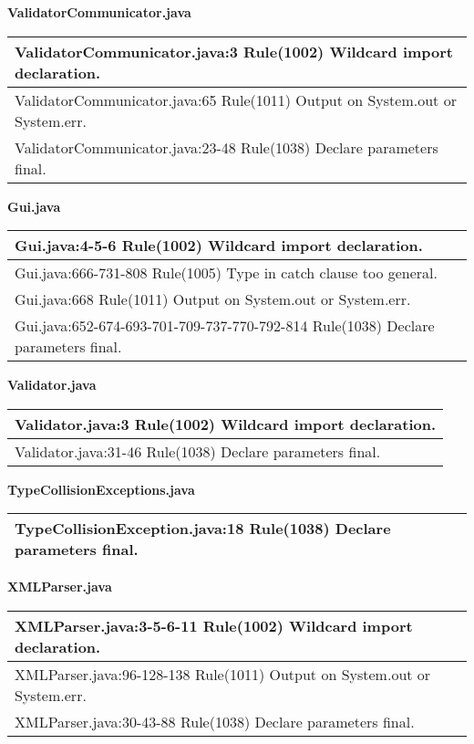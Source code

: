 \textbf{ValidatorCommunicator.java}
\begin{center}
\begin{tabular}{|p{12cm}|} \hline
ValidatorCommunicator.java:3 Rule(1002) Wildcard import declaration. \\ \hline
ValidatorCommunicator.java:65 Rule(1011) Output on System.out or System.err. \\ \hline
ValidatorCommunicator.java:23-48 Rule(1038) Declare parameters final. \\ \hline
\end{tabular}
\end{center}

\textbf{Gui.java}
\begin{center}
\begin{tabular}{|p{12cm}|} \hline
Gui.java:4-5-6 Rule(1002) Wildcard import declaration.\\ \hline
Gui.java:666-731-808 Rule(1005) Type in catch clause too general.\\ \hline
Gui.java:668 Rule(1011) Output on System.out or System.err.\\ \hline
Gui.java:652-674-693-701-709-737-770-792-814 Rule(1038) Declare parameters final.\\ \hline
\end{tabular}
\end{center}

\textbf{Validator.java}
\begin{center}
\begin{tabular}{|p{12cm}|} \hline
Validator.java:3 Rule(1002) Wildcard import declaration.\\ \hline
Validator.java:31-46 Rule(1038) Declare parameters final.\\ \hline
\end{tabular}
\end{center}

\textbf{TypeCollisionExceptions.java}
\begin{center}
\begin{tabular}{|p{12cm}|} \hline
TypeCollisionException.java:18 Rule(1038) Declare parameters final.\\ \hline
\end{tabular}
\end{center}

\textbf{XMLParser.java}
\begin{center}
\begin{tabular}{|p{12cm}|} \hline
XMLParser.java:3-5-6-11 Rule(1002) Wildcard import declaration.\\ \hline
XMLParser.java:96-128-138 Rule(1011) Output on System.out or System.err.\\ \hline
XMLParser.java:30-43-88 Rule(1038) Declare parameters final.\\ \hline
\end{tabular}
\end{center}

